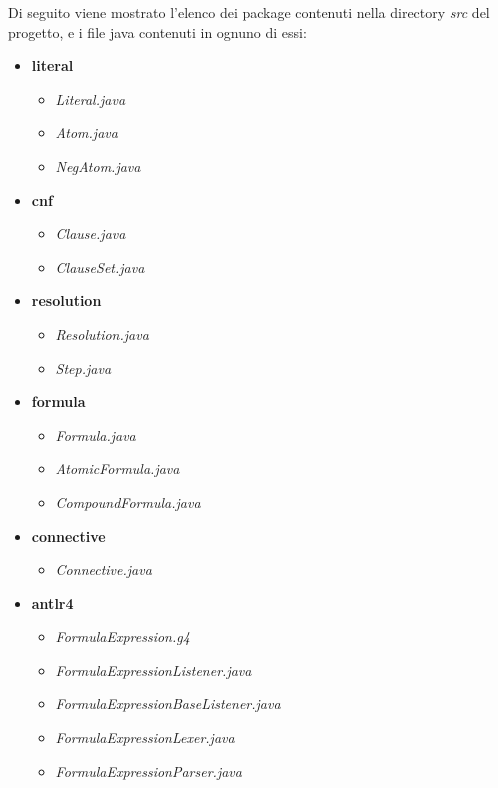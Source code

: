 \documentclass[a4paper,12pt]{report}
\begin{document}
Di seguito viene mostrato l'elenco dei package contenuti nella directory \textit{src} del progetto, e i file java contenuti in ognuno di essi:
\begin{itemize}
    \item \textbf{literal}
        \begin{itemize}
            \item \textit{Literal.java}
            \item \textit{Atom.java}
            \item \textit{NegAtom.java}
        \end{itemize}
    \item \textbf{cnf}
        \begin{itemize}
            \item \textit{Clause.java}
            \item \textit{ClauseSet.java}
        \end{itemize}
    \item \textbf{resolution}
        \begin{itemize}
            \item \textit{Resolution.java}
            \item \textit{Step.java}
        \end{itemize}
    \item \textbf{formula}
        \begin{itemize}
            \item \textit{Formula.java}
            \item \textit{AtomicFormula.java}
            \item \textit{CompoundFormula.java}
        \end{itemize}
    \item \textbf{connective}
        \begin{itemize}
            \item \textit{Connective.java}
        \end{itemize}
    \item \textbf{antlr4}
        \begin{itemize}
            \item \textit{FormulaExpression.g4}
            \item \textit{FormulaExpressionListener.java}
            \item \textit{FormulaExpressionBaseListener.java}
            \item \textit{FormulaExpressionLexer.java}
            \item \textit{FormulaExpressionParser.java}

\end{itemize}
\end{itemize}
\end{document}
